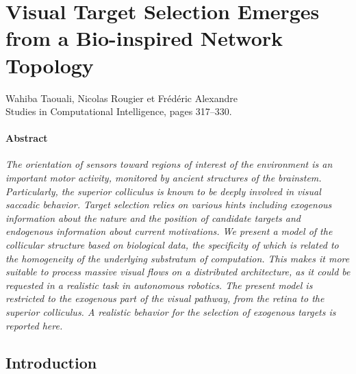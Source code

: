 \section{Visual Target Selection Emerges from a Bio-inspired Network Topology}
\begin{center}
Wahiba Taouali, Nicolas Rougier et Fr\'ed\'eric Alexandre\\
Studies in Computational Intelligence, pages 317--330.\\
\end{center}


\paragraph{Abstract}

 \textit{The orientation of sensors toward regions of interest of the
  environment is an important motor activity, monitored by ancient
  structures of the brainstem. Particularly, the superior colliculus
  is known to be deeply involved in visual saccadic behavior. Target
  selection relies on various hints including exogenous information
  about the nature and the position of candidate targets and
  endogenous information about current motivations. We present a model
  of the collicular structure based on biological data, the
  specificity of which is related to the homogeneity of the underlying
  substratum of computation. This makes it more suitable to process
  massive visual flows on a distributed architecture, as it could be
  requested in a realistic task in autonomous robotics. The present
  model is restricted to the exogenous part of the visual pathway,
  from the retina to the superior colliculus. A realistic behavior for
  the selection of exogenous targets is reported here.}


\subsection{Introduction}

